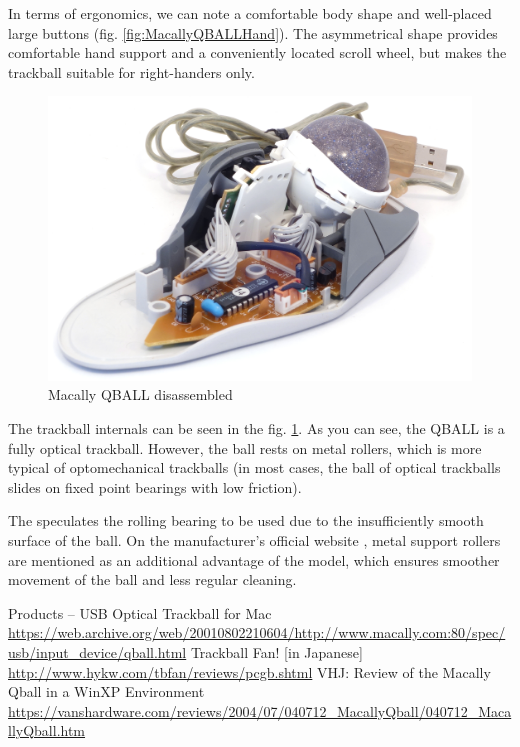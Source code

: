 \documentclass[11pt, a4paper]{article}
\begin{document}
In terms of ergonomics, we can note a comfortable body shape and well-placed large buttons (fig. \ref{fig:MacallyQBALLHand}). The asymmetrical shape provides comfortable hand support and a conveniently located scroll wheel, but makes the trackball suitable for right-handers only.

\begin{figure}[h]
    \centering
    \includegraphics[scale=0.7]{2001_macally_qball/inside_60.jpg}
    \caption{Macally QBALL disassembled}
    \label{fig:MacallyQBALLInside}
\end{figure}

The trackball internals can be seen in the fig. \ref{fig:MacallyQBALLInside}. As you can see, the QBALL is a fully optical trackball. However, the ball rests on metal rollers, which is more typical of optomechanical trackballs (in most cases, the ball of optical trackballs slides on fixed point bearings with low friction).

The \cite{trackballfan} speculates the rolling bearing to be used due to the insufficiently smooth surface of the ball. On the manufacturer's official website \cite{site}, metal support rollers are mentioned as an additional advantage of the model, which ensures smoother movement of the ball and less regular cleaning.

\begin{thebibliography}{9}
 Products -- USB Optical Trackball for Mac \url{https://web.archive.org/web/20010802210604/http://www.macally.com:80/spec/usb/input_device/qball.html}
 Trackball Fan! [in Japanese] \url{http://www.hykw.com/tbfan/reviews/pcgb.shtml}
 VHJ: Review of the Macally Qball in a WinXP Environment \url{https://vanshardware.com/reviews/2004/07/040712_MacallyQball/040712_MacallyQball.htm}
\end{thebibliography}
\end{document}
